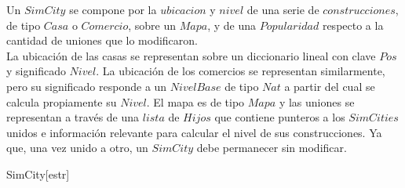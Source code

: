 \begin{Representacion}
  
Un $SimCity$ se compone por la $ubicacion$ y $nivel$ de una serie de $construcciones$, de tipo $Casa$ o $Comercio$, sobre un $Mapa$, y de una $Popularidad$ respecto a la cantidad de uniones que lo modificaron. \\

La ubicación de las casas se representan sobre un diccionario lineal con clave $Pos$ y significado $Nivel$. La ubicación de los comercios se representan similarmente, pero su significado responde a un $NivelBase$ de tipo $Nat$ a partir del cual se calcula propiamente su $Nivel$. El mapa es de tipo $Mapa$ y las uniones se representan a través de una $lista$ de $Hijos$ que contiene punteros a los $SimCities$ unidos e información relevante para calcular el nivel de sus construcciones. Ya que, una vez unido a otro, un $SimCity$ debe permanecer sin modificar. 

    \begin{Estructura}{SimCity}[estr]
        \begin{Tupla}[estr]
        \end{Tupla}
        
        \vspace{2mm}
        \begin{Tupla}[hijo]
        \end{Tupla}
        
        \vspace{2mm}
        \begin{Tupla}[pos]
        \end{Tupla}

    \end{Estructura}


\end{Representacion}
